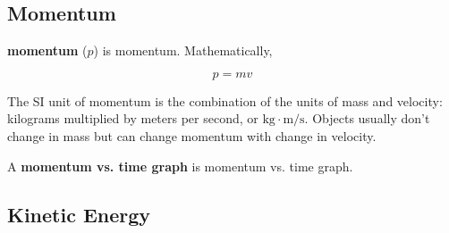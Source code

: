 \documentclass[dvipsnames]{article}
\begin{document}




\clearpage

\subsection{Momentum}


\textbf{\Gls{momentum}} ($p$) is \glsdesc{momentum}. Mathematically, 

\begin{equation*}
    p = mv
\end{equation*}

The SI unit of momentum is the combination of the units of mass and velocity: kilograms multiplied by meters per second, or $\mathrm{kg\cdot m/s}$. Objects usually don't change in mass but can change momentum with change in velocity. 


A \textbf{\gls{momentum vs. time graph}} is \glsdesc{momentum vs. time graph}.

\begin{center}
\end{center}

\subsection{Kinetic Energy}



\end{document}
